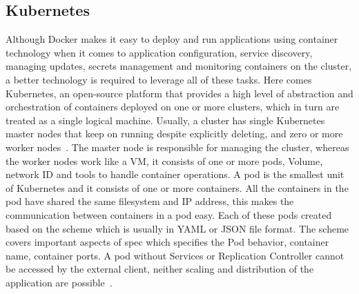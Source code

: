 \subsection{Kubernetes}
Although Docker makes it easy to deploy and run applications using
container technology when it comes to application configuration,
service discovery, managing updates, secrets management and monitoring
containers on the cluster, a better technology is required to leverage
all of these tasks. Here comes Kubernetes, an open-source platform
that provides a high level of abstraction and orchestration of
containers deployed on one or more clusters, which in turn are treated
as a single logical machine. Usually, a cluster has single Kubernetes
master nodes that keep on running despite explicitly deleting, and
zero or more worker nodes~\cite{hid-sp18-602-kubernetes}. The
master node is responsible for managing the cluster, whereas the
worker nodes work like a VM, it consists of one or more pods, Volume,
network ID and tools to handle container operations. A pod is the
smallest unit of Kubernetes and it consists of one or more
containers. All the containers in the pod have shared the same
filesystem and IP address, this makes the communication between
containers in a pod easy. Each of these pods created based on the
scheme which is usually in YAML or JSON file format. The scheme covers
important aspects of spec which specifies the Pod behavior, container
name, container ports. A pod without Services or Replication
Controller cannot be accessed by the external client, neither scaling
and distribution of the application are
possible~\cite{hid-sp18-602-pods}.

